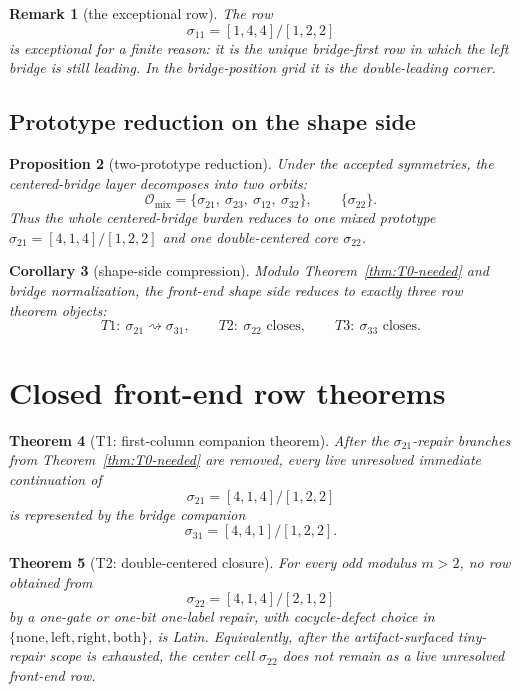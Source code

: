 \documentclass[11pt]{article}
\newtheorem{theorem}{Theorem}[section]
\newtheorem{proposition}[theorem]{Proposition}
\newtheorem{corollary}[theorem]{Corollary}
\newtheorem{remark}[theorem]{Remark}
\newcommand{\sig}[2]{\sigma_{#1#2}}
\newcommand{\Omix}{\mathcal O_{\mathrm{mix}}}
\begin{document}
\begin{remark}[the exceptional row]
The row
\[
\sig11=[1,4,4]/[1,2,2]
\]
is exceptional for a finite reason:
it is the unique bridge-first row in which the left bridge is still leading.
In the bridge-position grid it is the double-leading corner.
\end{remark}

\subsection{Prototype reduction on the shape side}

\begin{proposition}[two-prototype reduction]
\label{prop:two-prototypes}
Under the accepted symmetries, the centered-bridge layer decomposes into two
orbits:
\[
\Omix=
\{\sig21,\ \sig23,\ \sig12,\ \sig32\},
\qquad
\{\sig22\}.
\]
Thus the whole centered-bridge burden reduces to one mixed prototype
\(\sig21=[4,1,4]/[1,2,2]\) and one double-centered core \(\sig22\).
\end{proposition}

\begin{corollary}[shape-side compression]
\label{cor:shape-side-compression}
Modulo Theorem~\ref{thm:T0-needed} and bridge normalization, the front-end shape side
reduces to exactly three row theorem objects:
\[
T1:\ \sig21\rightsquigarrow \sig31,\qquad
T2:\ \sig22\text{ closes},\qquad
T3:\ \sig33\text{ closes}.
\]
\end{corollary}

\section{Closed front-end row theorems}
\label{sec:frontier}

\begin{theorem}[T1: first-column companion theorem]
\label{fr:T1}
After the \(\sig21\)-repair branches from Theorem~\ref{thm:T0-needed} are
removed, every live unresolved immediate continuation of
\[
\sig21=[4,1,4]/[1,2,2]
\]
is represented by the bridge companion
\[
\sig31=[4,4,1]/[1,2,2].
\]
\end{theorem}

\begin{theorem}[T2: double-centered closure]
\label{fr:T2}\label{thm:T2-closed}
For every odd modulus \(m>2\), no row obtained from
\[
\sig22=[4,1,4]/[2,1,2]
\]
by a one-gate or one-bit one-label repair, with cocycle-defect choice in
\(\{\mathrm{none},\mathrm{left},\mathrm{right},\mathrm{both}\}\), is Latin.
Equivalently, after the artifact-surfaced tiny-repair scope is exhausted, the
center cell \(\sig22\) does not remain as a live unresolved front-end row.
\end{theorem}
\end{document}
